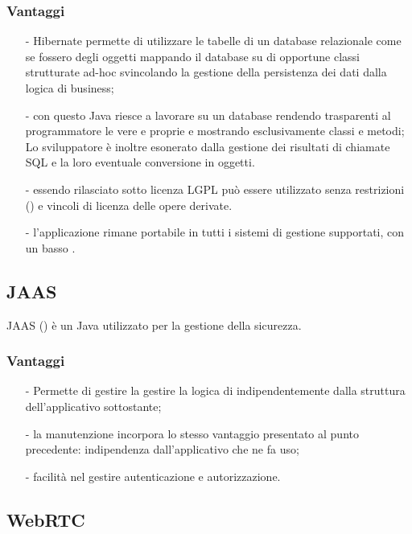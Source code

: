 \subsubsection*{Vantaggi}
\begin{itemize}[noitemsep,nolistsep]
\item[-] Hibernate permette di utilizzare le tabelle di un database relazionale come se fossero degli oggetti mappando il database su di opportune classi strutturate ad-hoc svincolando la gestione della persistenza dei dati dalla logica di business;
\item[-] con questo  Java riesce a lavorare su un database rendendo trasparenti al programmatore le vere e proprie  e mostrando esclusivamente classi e metodi; Lo sviluppatore è inoltre esonerato dalla gestione dei risultati di chiamate SQL e la loro eventuale conversione in oggetti.
\item[-] essendo rilasciato sotto licenza LGPL può essere utilizzato senza restrizioni () e vincoli di licenza delle opere derivate.
\item[-] l'applicazione rimane portabile in tutti i sistemi di gestione supportati, con un basso .
\end{itemize}

\subsection{JAAS}\label{sec:hibernate}

JAAS () è un  Java utilizzato per la gestione della sicurezza.

\subsubsection*{Vantaggi}
\begin{itemize}[noitemsep,nolistsep]
	\item[-] Permette di gestire la gestire la logica di  indipendentemente dalla struttura dell'applicativo sottostante;
	\item[-] la manutenzione incorpora lo stesso vantaggio presentato al punto precedente: indipendenza dall'applicativo che ne fa uso;
	\item[-] facilità nel gestire autenticazione e autorizzazione.
\end{itemize}

\subsection{WebRTC}\label{sec:hibernate}

